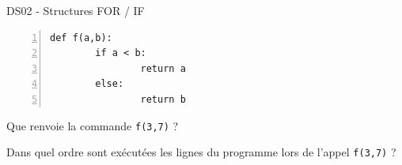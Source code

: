 \documentclass[a4paper,12pt,openany]{book}
\begin{document}
\begin{center}\begin{large}
DS02 - Structures FOR / IF
\end{large}\end{center}

\exo

\begin{minipage}{9cm}
	\begin{lstlisting}[numbers=left]
def f(a,b):
		if a < b:
				return a
		else:
				return b
\end{lstlisting}
\end{minipage}
\begin{minipage}{9cm}
\begin{liste}
	\item 	Que renvoie la commande \verb+f(3,7)+ ? \dotfill
	\item Dans quel ordre sont exécutées les lignes du programme lors de l'appel \verb+f(3,7)+ ? 
	
	\dotfill
	\end{liste}
\end{minipage}	

	
	
	\bigskip

\exo
\end{document}
